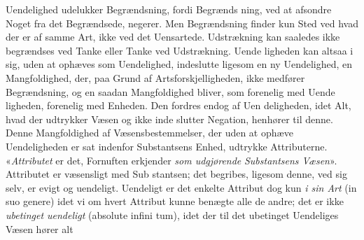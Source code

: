\documentclass[12pt,a4paper]{book}
\begin{document}
Uendelighed udelukker Begrændsning, fordi Begrænds\-%
ning, ved at afsondre Noget fra det Begrændsede, negerer.
Men Begrændsning finder kun Sted ved hvad der er af samme
Art, ikke ved det Uensartede. Udstrækning kan saaledes ikke
begrændses ved Tanke eller Tanke ved Udstrækning. Uende\-%
ligheden kan altsaa i sig, uden at ophæves som Uendelighed,
indeslutte ligesom en ny Uendelighed, en Mangfoldighed, der,
paa Grund af Artsforskjelligheden, ikke medfører Begrændsning,
og en saadan Mangfoldighed bliver, som forenelig med Uende\-%
ligheden, forenelig med Enheden. Den fordres endog af Uen\-%
deligheden, idet Alt, hvad der udtrykker Væsen og ikke inde\-%
slutter Negation, henhører til denne. Denne Mangfoldighed af
Væsensbestemmelser, der uden at ophæve Uendeligheden er
sat indenfor Substantsens Enhed, udtrykke Attributerne.
«\emph{Attributet} er det, Fornuften erkjender \emph{som udgjørende}
\emph{Substantsens Væsen}». Attributet er væsensligt med Sub\-%
stantsen; det begribes, ligesom denne, ved sig selv, er evigt og
uendeligt. Uendeligt er det enkelte Attribut dog kun \emph{i sin Art}
(in suo genere) idet vi om hvert Attribut kunne benægte alle de
andre; det er ikke \emph{ubetinget uendeligt} (absolute infini\-%
tum), idet der til det ubetinget Uendeliges Væsen hører alt
\end{document}
